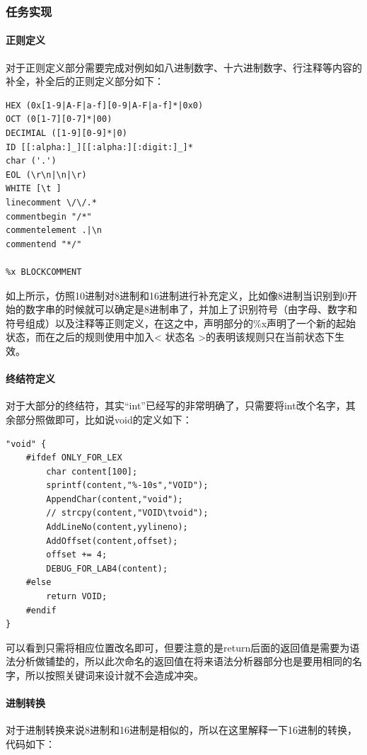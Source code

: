 \documentclass[UTF8,a4paper,10pt]{ctexart}
\begin{document}
\subsubsection{任务实现}
\paragraph{正则定义}
对于正则定义部分需要完成对例如如八进制数字、十六进制数字、行注释等内容的补全，补全后的正则定义部分如下：
\begin{lstlisting}[title = 词法分析部分的正则定义]
HEX (0x[1-9|A-F|a-f][0-9|A-F|a-f]*|0x0)
OCT (0[1-7][0-7]*|00)
DECIMIAL ([1-9][0-9]*|0)
ID [[:alpha:]_][[:alpha:][:digit:]_]*
char ('.')
EOL (\r\n|\n|\r)
WHITE [\t ]
linecomment \/\/.*
commentbegin "/*"
commentelement .|\n
commentend "*/"

%x BLOCKCOMMENT
\end{lstlisting}
如上所示，仿照10进制对8进制和16进制进行补充定义，比如像8进制当识别到0开始的数字串的时候就可以确定是8进制串了，并加上了识别符号（由字母、数字和符号组成）以及注释等正则定义，在这之中，声明部分的\%x声明了一个新的起始状态，而在之后的规则使用中加入< 状态名 >的表明该规则只在当前状态下生效。

\paragraph{终结符定义}
对于大部分的终结符，其实“int”已经写的非常明确了，只需要将int改个名字，其余部分照做即可，比如说void的定义如下：
\begin{lstlisting}[title = 仿照int定义void]
"void" {
    #ifdef ONLY_FOR_LEX
        char content[100];
        sprintf(content,"%-10s","VOID");
        AppendChar(content,"void");
        // strcpy(content,"VOID\tvoid");
        AddLineNo(content,yylineno);
        AddOffset(content,offset);
        offset += 4;
        DEBUG_FOR_LAB4(content);
    #else
        return VOID;
    #endif 
}
\end{lstlisting}

可以看到只需将相应位置改名即可，但要注意的是return后面的返回值是需要为语法分析做铺垫的，所以此次命名的返回值在将来语法分析器部分也是要用相同的名字，所以按照关键词来设计就不会造成冲突。

\paragraph{进制转换}
对于进制转换来说8进制和16进制是相似的，所以在这里解释一下16进制的转换，代码如下：
\end{document}
